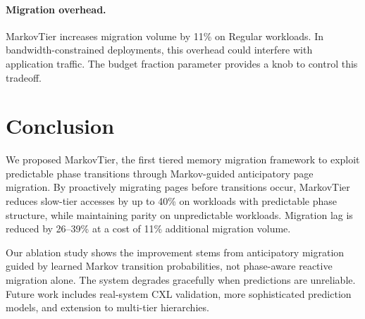 \documentclass[preprint]{article}
\begin{document}
\paragraph{Migration overhead.}
MarkovTier increases migration volume by 11\% on Regular workloads. In bandwidth-constrained deployments, this overhead could interfere with application traffic. The budget fraction parameter provides a knob to control this tradeoff.

\section{Conclusion}
\label{sec:conclusion}

We proposed MarkovTier, the first tiered memory migration framework to exploit predictable phase transitions through Markov-guided anticipatory page migration. By proactively migrating pages before transitions occur, MarkovTier reduces slow-tier accesses by up to 40\% on workloads with predictable phase structure, while maintaining parity on unpredictable workloads. Migration lag is reduced by 26--39\% at a cost of 11\% additional migration volume.

Our ablation study shows the improvement stems from anticipatory migration guided by learned Markov transition probabilities, not phase-aware reactive migration alone. The system degrades gracefully when predictions are unreliable. Future work includes real-system CXL validation, more sophisticated prediction models, and extension to multi-tier hierarchies.



\end{document}
